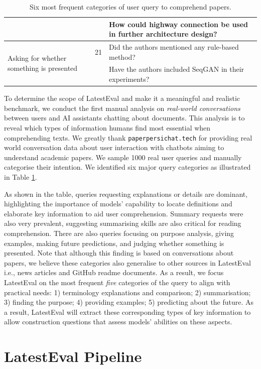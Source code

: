 \documentclass[letterpaper]{article} %
\begin{document}
\begin{table}[t]
\begin{tabular}{p{4cm}rp{10cm}}
        && How could highway connection be used in further architecture design? \\
        \midrule
        \multirow{2}{4cm}{Asking for whether something is presented} & 21 & Did the authors mentioned any rule-based method? \\
        && Have the authors included SeqGAN in their experiments? \\
    \bottomrule
    \end{tabular}
    \caption{Six most frequent categories of user query to comprehend papers.}
    \label{tab:scope}
\end{table}

To determine the scope of LatestEval and make it a meaningful and realistic benchmark, we conduct the first manual analysis on \textit{real-world conversations} between users and AI assistants chatting about documents. This analysis is to reveal which types of information humans find most essential when comprehending texts. We greatly thank \texttt{paperpersichat.tech} for providing real world conversation data about user interaction with chatbots aiming to understand academic papers. We sample 1000 real user queries and manually categorise their intention. We identified six major query categories as illustrated in Table \ref{tab:scope}.

As shown in the table, queries requesting explanations or details are dominant, highlighting the importance of models' capability to locate definitions and elaborate key information to aid user comprehension. Summary requests were also very prevalent, suggesting summarising skills are also critical for reading comprehension. There are also queries focusing on purpose analysis, giving examples, making future predictions, and judging whether something is presented. Note that although this finding is based on conversations about papers, we believe these categories also generalise to other sources in LatestEval i.e., news articles and GitHub readme documents. As a result, we focus LatestEval on the most frequent \textit{five} categories of the query to align with practical needs: 1) terminology explanations and comparison; 2) summarisation; 3) finding the purpose; 4) providing examples; 5) predicting about the future. As a result, LatestEval will extract these corresponding types of key information to allow construction questions that assess models' abilities on these aspects.

\section{LatestEval Pipeline}
\end{document}
